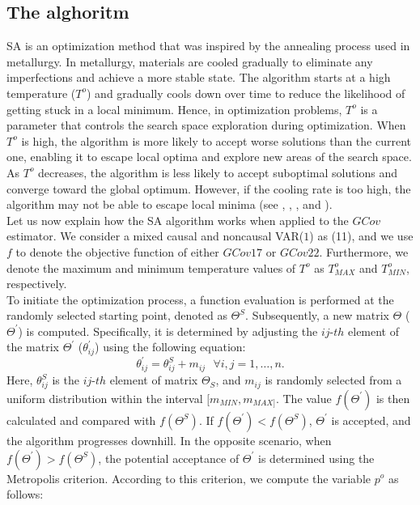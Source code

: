 \documentclass[<1p>]{elsarticle} %
\begin{document}
\subsection{The alghoritm}
\indent SA is an optimization method that was inspired by the annealing process used in metallurgy. In metallurgy, materials are cooled gradually to eliminate any imperfections and achieve a more stable state. The algorithm starts at a high temperature ($T^o$) and gradually cools down over time to reduce the likelihood of getting stuck in a local minimum. Hence, in optimization problems, $T^o$ is a parameter that controls the search space exploration during optimization. When $T^o$ is high, the algorithm is more likely to accept worse solutions than the current one, enabling it to escape local optima and explore new areas of the search space. As $T^o$ decreases, the algorithm is less likely to accept suboptimal solutions and converge toward the global optimum. However, if the cooling rate is too high, the algorithm may not be able to escape local minima (see \cite{corana1987minimizing}, \cite{goffe1992simulated}, \cite{goffe1994global}, and \cite{goffe1996simann}).\\
\indent Let us now explain how the SA algorithm works when applied to the $GCov$ estimator. We consider a mixed causal and noncausal VAR($1$) as (11), and we use $f$ to denote the objective function of either $GCov17$ or $GCov22$. Furthermore, we denote the maximum and minimum temperature values of $T^{o}$ as $T^{o}_{MAX}$ and $T^{o}_{MIN}$, respectively.\\
\indent To initiate the optimization process, a function evaluation is performed at the randomly selected starting point, denoted as $\Theta^{S}$. Subsequently, a new matrix $\Theta$ ($\Theta^{\prime}$) is computed. Specifically, it is determined by adjusting the $ij$-$th$ element of the matrix $\Theta^{\prime}$ ($\theta^{\prime}_{ij}$) using the following equation:
\begin{equation}
\theta^{\prime}_{ij} = \theta^{S}_{ij} + m_{ij} \ \ \ \forall i, j = 1, \dots, n.
\end{equation}
Here, $\theta^{S}_{ij}$ is the $ij$-$th$ element of matrix $\Theta_S$, and $m_{ij}$ is randomly selected from a uniform distribution within the interval $[m_{MIN}, m_{MAX]}$. The value $f(\Theta^{\prime})$ is then calculated and compared with $f(\Theta^{S})$. If $f(\Theta^{\prime}) < f(\Theta^{S})$, $\Theta^{\prime}$ is accepted, and the algorithm progresses downhill. In the opposite scenario, when $f(\Theta^{\prime}) > f(\Theta^{S})$, the potential acceptance of $\Theta^{\prime}$ is determined using the Metropolis criterion. According to this criterion, we compute the variable $p^o$ as follows:
\end{document}
